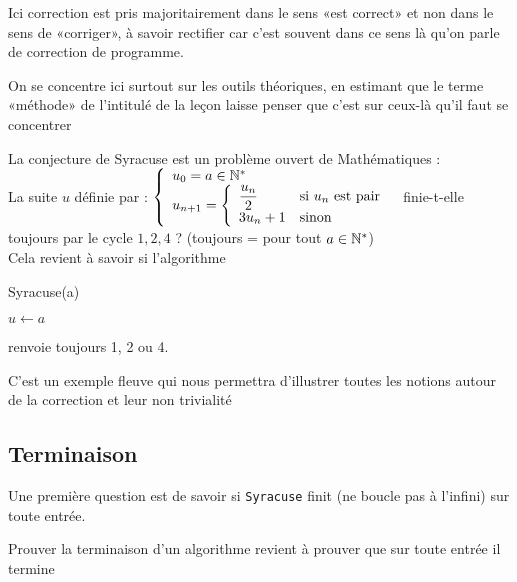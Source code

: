 

\begin{com}
	Ici correction est pris majoritairement dans le sens «est correct» et non dans le sens de «corriger», à savoir rectifier car c'est souvent dans ce sens là qu'on parle de correction de programme.
\end{com}

\begin{com}
	On se concentre ici surtout sur les outils théoriques, en estimant que le terme «méthode» de l'intitulé de la leçon laisse penser que c'est sur ceux-là qu'il faut se concentrer
\end{com}

La conjecture de Syracuse est un problème ouvert de Mathématiques : \\
La suite $u$ définie par : $\left\{ \begin{array}{l}
	u_0 = a \in \mathbb{N}^*\\
	u_{n+1} = \left\{\begin{array}{ll}
		\dfrac{u_n}{2} & \text{si } u_n \text{ est pair}\\
		3u_n+1 & \text{sinon}
	\end{array}\right.
\end{array}\right.$ finie-t-elle toujours par le cycle $1,2,4$ ? (toujours = pour tout $a\in \mathbb{N}^*$)\\

Cela revient à savoir si l'algorithme \\
\begin{algorithm}[H]
	\caption{Syracuse(a)}
	$u \gets a$\\
\end{algorithm}
renvoie toujours 1, 2 ou 4.

\begin{com}
	C'est un exemple fleuve qui nous permettra d'illustrer toutes les notions autour de la correction et leur non trivialité
\end{com}
\subsection{Terminaison}
Une première question est de savoir si \texttt{Syracuse} finit (ne boucle pas à l'infini) sur toute entrée.

\begin{definition}
	Prouver la terminaison d'un algorithme revient à prouver que sur toute entrée il termine
\end{definition}

